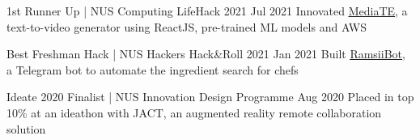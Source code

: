 \begin{cventries}
  \cventry
    {1st Runner Up | NUS Computing LifeHack 2021} %
    {} %
    {} %
    {Jul 2021} %
    {Innovated \href{https://github.com/AllardQuek/MediaTE}{\underline{MediaTE}}, a text-to-video generator using ReactJS, pre-trained ML models and AWS} %

  \cventry
    {Best Freshman Hack | NUS Hackers Hack\&Roll 2021} %
    {} %
    {} %
    {Jan 2021} %
    {Built \href{https://github.com/AllardQuek/RamsiiBot}{\underline{RamsiiBot}}, a Telegram bot to automate the ingredient search for chefs} %

  \cventry
    {Ideate 2020 Finalist | NUS Innovation Design Programme} %
    {} %
    {} %
    {Aug 2020} %
    {Placed in top 10\% at an ideathon with JACT, an augmented reality remote collaboration solution} %

\end{cventries}